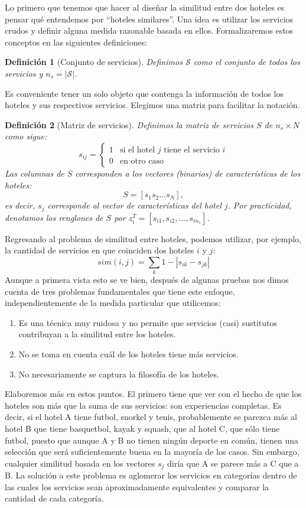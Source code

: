 \documentclass[12pt]{report}
\newtheorem{defn}{Definici\'on}[chapter]
\begin{document}
Lo primero que tenemos que hacer al diseñar la similitud entre dos hoteles es pensar qué entendemos por ``hoteles similares''. Una idea es utilizar los servicios crudos y definir alguna medida razonable basada en ellos. Formalizaremos estos conceptos en las siguientes definiciones:
\begin{defn}[Conjunto de servicios]
Definimos $\mathcal{S}$ como el conjunto de todos los servicios y $n_s = |\mathcal{S}|$.
\end{defn}
Es conveniente tener un solo objeto que contenga la información de todos los hoteles y sus respectivos servicios. Elegimos una matriz para facilitar la notación.
\begin{defn}[Matriz de servicios]
Definimos la matriz de servicios $S$ de $n_s \times N$ como sigue:
\[
s_{ij} = \left\{
\begin{array}{ll}
1 & \text{si el hotel $j$ tiene el servicio $i$}\\
0 & \text{en otro caso}
\end{array}
\right.
\]
Las columnas de $S$ corresponden a los vectores (binarios) de características de los hoteles:
\[
S = [s_1 s_2 \dots s_N],
\]
es decir, $s_j$ corresponde al vector de características del hotel $j$. Por practicidad, denotamos los renglones de $S$ por $z_i^T = [s_{i1}, s_{i2}, \dots, s_{in_s}]$.
\end{defn}
Regresando al problema de similitud entre hoteles, podemos utilizar, por ejemplo, la cantidad de servicios en que coinciden dos hoteles $i$ y $j$:
\[
sim(i,j) = \sum_k 1 - |s_{ik} - s_{jk}|
\]
Aunque a primera vista esto se ve bien, después de algunas pruebas nos dimos cuenta de tres problemas fundamentales que tiene este enfoque, independientemente de la medida particular que utilicemos:
\begin{enumerate}
	\item Es una técnica muy ruidosa y no permite que servicios (casi) sustitutos contribuyan a la similitud entre los hoteles.
	\item No se toma en cuenta cuál de los hoteles tiene más servicios.
	\item No necesariamente se captura la filosofía de los hoteles.
\end{enumerate}
Elaboremos más en estos puntos. El primero tiene que ver con el hecho de que los hoteles son más que la suma de sus servicios: son experiencias completas. Es decir, si el hotel A tiene futbol, snorkel y tenis, probablemente se parezca más al hotel B que tiene basquetbol, kayak y squash, que al hotel C, que sólo tiene futbol, puesto que aunque A y B no tienen ningún deporte en común, tienen una selección que será suficientemente buena en la mayoría de los casos. Sin embargo, cualquier similitud basada en los vectores $s_j$ diría que A se parece más a C que a B. La solución a este problema es aglomerar los servicios en categorías dentro de las cuales los servicios sean aproximadamente equivalentes y comparar la cantidad de cada categoría.
\end{document}
